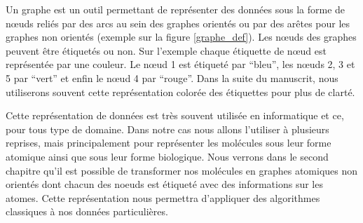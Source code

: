 Un graphe est un outil permettant de représenter des données sous la forme de n\oe{}uds reliés par des arcs au sein des graphes orientés ou par des arêtes pour les graphes non orientés (exemple sur la figure \ref{graphe_def}).
Les n\oe{}uds des graphes peuvent être étiquetés ou non.
Sur l'exemple chaque étiquette de n\oe{}ud est représentée par une couleur.
Le n\oe{}ud 1 est étiqueté par ``bleu'', les n\oe{}uds 2, 3 et 5 par ``vert'' et enfin le n\oe{}ud 4 par ``rouge''.
Dans la suite du manuscrit, nous utiliserons souvent cette représentation colorée des étiquettes pour plus de clarté.

Cette représentation de données est très souvent utilisée en informatique et ce, pour tous type de domaine.
Dans notre cas nous allons l'utiliser à plusieurs reprises, mais principalement pour représenter les molécules sous leur forme atomique ainsi que sous leur forme biologique.
Nous verrons dans le second chapitre qu'il est possible de transformer nos molécules en graphes atomiques non orientés dont chacun des noeuds est étiqueté avec des informations sur les atomes.
Cette représentation nous permettra d'appliquer des algorithmes classiques à nos données particulières.





























